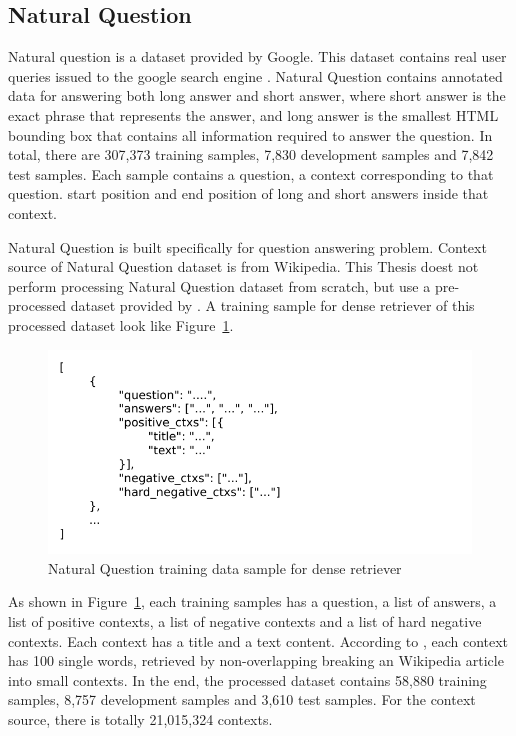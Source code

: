 \documentclass[12pt, sort&compress]{report}
\begin{document}
\subsection{Natural Question}
\label{sec:4.1.1}
Natural question is a dataset provided by Google. This dataset contains real user queries issued to the google search engine \cite{kwiatkowski2019natural}. Natural Question contains annotated data for answering both long answer and short answer, where short answer is the exact phrase that represents the answer, and long answer is the smallest HTML bounding box that contains all information required to answer the question. In total, there are 307,373 training samples, 7,830 development samples and 7,842 test samples. Each sample contains a question, a context corresponding to that question. start position and end position of long and short answers inside that context. 
\par Natural Question is built specifically for question answering problem. Context source of Natural Question dataset is from Wikipedia. This Thesis doest not perform processing Natural Question dataset from scratch, but use a pre-processed dataset provided by \cite{karpukhin2020dense}. A training sample for dense retriever of this processed dataset look like Figure~\ref{fig:11}.
\begin{figure}[!htbp]
	\centering
	\includegraphics[scale=1.]{images/PDF/retriever_sample/nq_sample.pdf}
	\caption{Natural Question training data sample for dense retriever}
	\label{fig:11}
\end{figure} 
\par As shown in Figure~\ref{fig:11}, each training samples has a question, a list of answers, a list of positive contexts, a list of negative contexts and a list of hard negative contexts. Each context has a title and a text content. According to \cite{karpukhin2020dense}, each context has 100 single words, retrieved by non-overlapping breaking an Wikipedia article into small contexts. In the end, the processed dataset contains 58,880 training samples, 8,757 development samples and  3,610 test samples. For the context source, there is totally 21,015,324 contexts.
\end{document}
